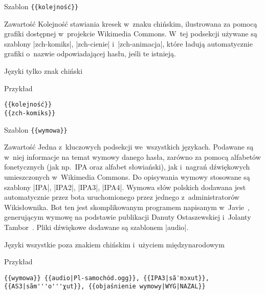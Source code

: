 \spacer
\begin{opis}
	\item[Szablon] \verb|{{kolejność}}|
	\item[Zawartość] Kolejność stawiania kresek w~znaku chińskim, ilustrowana za pomocą grafiki dostępnej w~projekcie Wikimedia Commons. W~tej podsekcji używane są szablony \kod|{{zch-komiks}}|, \kod|{{zch-cienie}}| i~\kod|{{zch-animacja}}|, które ładują automatycznie grafiki o~nazwie odpowiadającej hasłu, jeśli te istnieją.
	\item[Języki] tylko znak chiński
	\item[Przykład]
\begin{lstlisting}
{{kolejność}}
{{zch-komiks}}
\end{lstlisting}
\end{opis}
\spacer
\begin{opis}
	\item[Szablon] \verb|{{wymowa}}|
	\item[Zawartość] Jedna z~kluczowych podsekcji we~wszystkich językach. Podawane są w~niej informacje na temat wymowy danego hasła, zarówno za pomocą alfabetów fonetycznych (jak np.\ IPA oraz alfabet słowiański), jak i~nagrań dźwiękowych umieszczonych w~Wikimedia Commons. Do opisywania wymowy stosowane są szablony \kod|{{IPA}}|, \kod|{{IPA2}}|, \kod|{{IPA3}}|, \kod|{{IPA4}}|. Wymowa słów polskich dodawana jest automatycznie przez bota uruchomionego przez jednego z~administratorów Wikisłownika. Bot ten jest skomplikowanym programem napisanym w~Javie~\cite{wikt:olafbot}, generującym wymowę na podstawie publikacji Danuty Ostaszewskiej i~Jolanty Tambor~\cite{fonetyka}.
	Pliki dźwiękowe dodawane są szablonem \kod|{{audio}}|.
	\item[Języki] wszystkie poza znakiem chińskim i~użyciem międzynarodowym
	\item[Przykład]
\begin{lstlisting}
{{wymowa}} {{audio|Pl-samochód.ogg}}, {{IPA3|sãˈmɔxut}}, {{AS3|sãm'''o'''χut}}, {{objaśnienie wymowy|WYG|NAZAL}}
\end{lstlisting}
\end{opis}
\spacer
